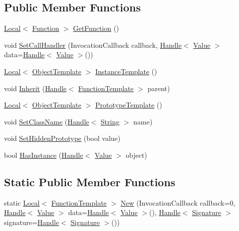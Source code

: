 \subsection*{Public Member Functions}
\begin{DoxyCompactItemize}
\item 
\hyperlink{classv8_1_1_local}{Local}$<$ \hyperlink{classv8_1_1_function}{Function} $>$ \hyperlink{classv8_1_1_function_template_a3b8e5e214b2ee34c36138961ebac696a}{Get\+Function} ()
\item 
void \hyperlink{classv8_1_1_function_template_a9eb1c827b17faf398a81068721bf40ab}{Set\+Call\+Handler} (Invocation\+Callback callback, \hyperlink{classv8_1_1_handle}{Handle}$<$ \hyperlink{classv8_1_1_value}{Value} $>$ data=\hyperlink{classv8_1_1_handle}{Handle}$<$ \hyperlink{classv8_1_1_value}{Value} $>$())
\item 
\hyperlink{classv8_1_1_local}{Local}$<$ \hyperlink{classv8_1_1_object_template}{Object\+Template} $>$ \hyperlink{classv8_1_1_function_template_a00dd9725566908e8fd14064542f5a781}{Instance\+Template} ()
\item 
void \hyperlink{classv8_1_1_function_template_a18f343e7e5749ed886d6e76a1424216e}{Inherit} (\hyperlink{classv8_1_1_handle}{Handle}$<$ \hyperlink{classv8_1_1_function_template}{Function\+Template} $>$ parent)
\item 
\hyperlink{classv8_1_1_local}{Local}$<$ \hyperlink{classv8_1_1_object_template}{Object\+Template} $>$ \hyperlink{classv8_1_1_function_template_aa2bcc2652b5f0fdbc666d943ccf72021}{Prototype\+Template} ()
\item 
void \hyperlink{classv8_1_1_function_template_a10ad6f0d3d1f67823e08fbca7c5dde41}{Set\+Class\+Name} (\hyperlink{classv8_1_1_handle}{Handle}$<$ \hyperlink{classv8_1_1_string}{String} $>$ name)
\item 
void \hyperlink{classv8_1_1_function_template_ade426e8a21d777ae6100e6c1aa7bfaee}{Set\+Hidden\+Prototype} (bool value)
\item 
bool \hyperlink{classv8_1_1_function_template_aa883e4ab6643498662f7873506098c98}{Has\+Instance} (\hyperlink{classv8_1_1_handle}{Handle}$<$ \hyperlink{classv8_1_1_value}{Value} $>$ object)
\end{DoxyCompactItemize}
\subsection*{Static Public Member Functions}
\begin{DoxyCompactItemize}
\item 
static \hyperlink{classv8_1_1_local}{Local}$<$ \hyperlink{classv8_1_1_function_template}{Function\+Template} $>$ \hyperlink{classv8_1_1_function_template_af9012aee4a102c4018fec8e9532cb996}{New} (Invocation\+Callback callback=0, \hyperlink{classv8_1_1_handle}{Handle}$<$ \hyperlink{classv8_1_1_value}{Value} $>$ data=\hyperlink{classv8_1_1_handle}{Handle}$<$ \hyperlink{classv8_1_1_value}{Value} $>$(), \hyperlink{classv8_1_1_handle}{Handle}$<$ \hyperlink{classv8_1_1_signature}{Signature} $>$ signature=\hyperlink{classv8_1_1_handle}{Handle}$<$ \hyperlink{classv8_1_1_signature}{Signature} $>$())
\end{DoxyCompactItemize}
